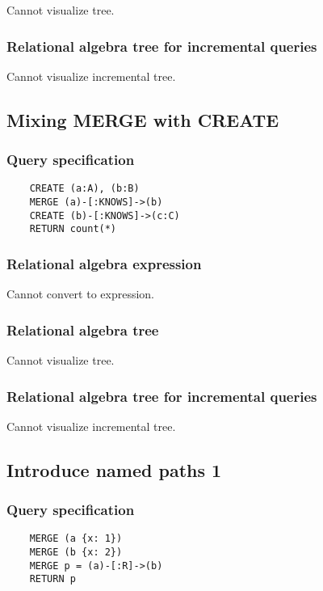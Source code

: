 	Cannot visualize tree.

	\subsubsection*{Relational algebra tree for incremental queries}

	Cannot visualize incremental tree.
	\subsection{Mixing MERGE with CREATE}

	\subsubsection*{Query specification}

	\begin{lstlisting}
	CREATE (a:A), (b:B)
	MERGE (a)-[:KNOWS]->(b)
	CREATE (b)-[:KNOWS]->(c:C)
	RETURN count(*)
	\end{lstlisting}


	\subsubsection*{Relational algebra expression}

	Cannot convert to expression.

	\subsubsection*{Relational algebra tree}

	Cannot visualize tree.

	\subsubsection*{Relational algebra tree for incremental queries}

	Cannot visualize incremental tree.
	\subsection{Introduce named paths 1}

	\subsubsection*{Query specification}

	\begin{lstlisting}
	MERGE (a {x: 1})
	MERGE (b {x: 2})
	MERGE p = (a)-[:R]->(b)
	RETURN p
	\end{lstlisting}


